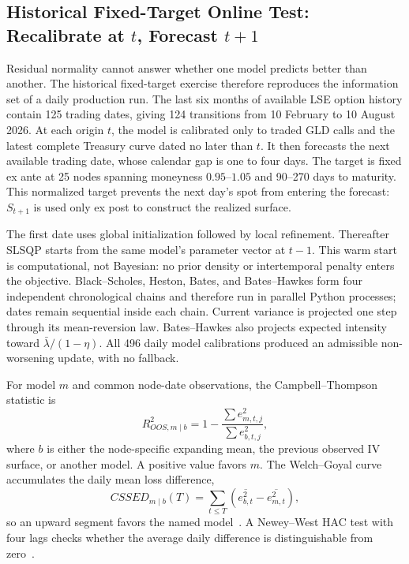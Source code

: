 \subsection{Historical Fixed-Target Online Test: Recalibrate at \texorpdfstring{\(t\)}{t}, Forecast \texorpdfstring{\(t+1\)}{t+1}}

Residual normality cannot answer whether one model predicts better than another. The historical fixed-target exercise therefore reproduces the information set of a daily production run. The last six months of available LSE option history contain 125 trading dates, giving 124 transitions from 10 February to 10 August 2026. At each origin \(t\), the model is calibrated only to traded GLD calls and the latest complete Treasury curve dated no later than \(t\). It then forecasts the next available trading date, whose calendar gap is one to four days. The target is fixed ex ante at 25 nodes spanning moneyness \(0.95\)--\(1.05\) and 90--270 days to maturity. This normalized target prevents the next day's spot from entering the forecast: \(S_{t+1}\) is used only ex post to construct the realized surface.

The first date uses global initialization followed by local refinement. Thereafter SLSQP starts from the same model's parameter vector at \(t-1\). This warm start is computational, not Bayesian: no prior density or intertemporal penalty enters the objective. Black--Scholes, Heston, Bates, and Bates--Hawkes form four independent chronological chains and therefore run in parallel Python processes; dates remain sequential inside each chain. Current variance is projected one step through its mean-reversion law. Bates--Hawkes also projects expected intensity toward \(\bar\lambda/(1-\eta)\). All 496 daily model calibrations produced an admissible non-worsening update, with no fallback.

For model \(m\) and common node-date observations, the Campbell--Thompson statistic is
\begin{equation}
R^2_{OOS,m\mid b}=1-\frac{\sum e_{m,t,j}^2}{\sum e_{b,t,j}^2},
\end{equation}
where \(b\) is either the node-specific expanding mean, the previous observed IV surface, or another model. A positive value favors \(m\). The Welch--Goyal curve accumulates the daily mean loss difference,
\begin{equation}
CSSED_{m\mid b}(T)=\sum_{t\leq T}\left(\overline{e_{b,t}^2}-\overline{e_{m,t}^2}\right),
\end{equation}
so an upward segment favors the named model~\cite{WelchGoyal2008,CampbellThompson2008}. A Newey--West HAC test with four lags checks whether the average daily difference is distinguishable from zero~\cite{NeweyWest1987}.

